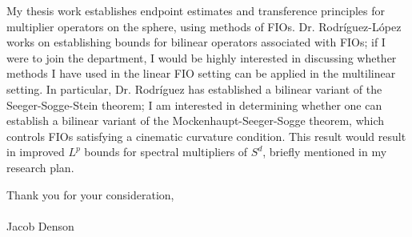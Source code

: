 \documentclass[11pt,stdletter,orderfromtodate,sigleft]{newlfm}
\begin{document}
\begin{newlfm}
My thesis work establishes endpoint estimates and transference principles for multiplier operators on the sphere, using methods of FIOs. Dr. Rodr\'{i}guez-L\'{o}pez works on establishing bounds for bilinear operators associated with FIOs; if I were to join the department, I would be highly interested in discussing whether methods I have used in the linear FIO setting can be applied in the multilinear setting. In particular, Dr. Rodr\'{i}guez has established a bilinear variant of the Seeger-Sogge-Stein theorem; I am interested in determining whether one can establish a bilinear variant of the Mockenhaupt-Seeger-Sogge theorem, which controls FIOs satisfying a cinematic curvature condition. This result would result in improved $L^p$ bounds for spectral multipliers of $S^d$, briefly mentioned in my research plan.

Thank you for your consideration,\\\\
Jacob Denson

\end{newlfm}
\end{document}

